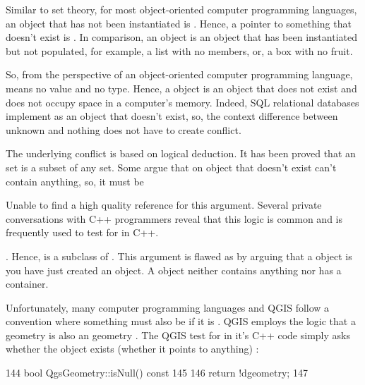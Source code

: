 \documentclass[a4paper,11pt,english]{sphinxmanual}
\begin{document}
Similar to set theory, for most object-oriented computer programming languages, an object that has not been instantiated is .  Hence, a pointer to something that doesn’t exist is . In comparison, an  object is an object that has been instantiated but not populated, for example, a list with no members, or, a box with no fruit.

So, from the perspective of an object-oriented computer programming language,  means no value and no type.  Hence, a  object is an object that does not exist and does not occupy space in a computer’s memory.  Indeed, SQL relational databases implement  as an object that doesn’t exist, so, the context difference between unknown and nothing does not have to create conflict.

The underlying conflict is based on logical deduction.  It has been proved that an  set is a subset of any set.  Some argue that on object that doesn’t exist can’t contain anything, so, it must be  %
\begin{footnote}[11]\sphinxAtStartFootnote
Unable to find a high quality reference for this argument.  Several private conversations with C++ programmers reveal that this logic is common and is frequently used to test for  in C++.
%
\end{footnote}.  Hence,  is a subclass of .  This argument is flawed as by arguing that a  object is  you have just created an object.  A  object neither contains anything nor has a container.

Unfortunately, many computer programming languages and QGIS follow a convention where something must also be  if it is .  QGIS employs the logic that a  geometry is also an  geometry .    The QGIS test for  in it’s C++ code simply asks whether the object exists (whether it points to anything) :

\begin{sphinxVerbatim}[commandchars=\\\{\}]
144 bool QgsGeometry::isNull() const
145 \PYGZob{}
146  return !d\PYGZhy{}\PYGZgt{}geometry;
147 \PYGZcb{}
\end{sphinxVerbatim}
\end{document}
